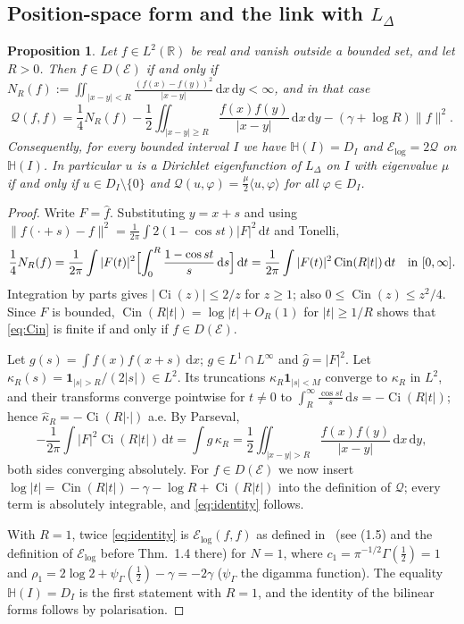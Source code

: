 \documentclass[11pt]{amsart}
\newcommand{\R}{\mathbb{R}}
\newcommand{\E}{\mathcal{E}}
\newcommand{\Hs}{\mathbb{H}}
\newcommand{\LD}{L_\Delta}
\newcommand{\one}{\mathbf{1}}
\newcommand{\dd}{\,\mathrm{d}}
\DeclareMathOperator{\Cin}{Cin}
\DeclareMathOperator{\Ci}{Ci}
\newtheorem{proposition}[theorem]{Proposition}
\theoremstyle{definition}
\theoremstyle{remark}
\numberwithin{equation}{section}
\begin{document}
\subsection{Position-space form and the link with \texorpdfstring{$\LD$}{L-Delta}}

\begin{proposition}\label{prop:identity}
Let $f\in L^2(\R)$ be real and vanish outside a bounded set, and let $R>0$. Then $f\in D(\E)$ if and only if $N_R(f):=\iint_{|x-y|<R}\frac{(f(x)-f(y))^2}{|x-y|}\dd x\dd y<\infty$, and in that case
\begin{equation}\label{eq:identity}
\mathcal Q(f,f)=\frac14N_R(f)-\frac12\iint_{|x-y|\ge R}\frac{f(x)f(y)}{|x-y|}\dd x\dd y-(\gamma+\log R)\|f\|^2 .
\end{equation}
Consequently, for every bounded interval $I$ we have $\Hs(I)=D_I$ and $\E_{\log}=2\mathcal Q$ on $\Hs(I)$. In particular $u$ is a Dirichlet eigenfunction of $\LD$ on $I$ with eigenvalue $\mu$ if and only if $u\in D_I\setminus\{0\}$ and $\mathcal Q(u,\varphi)=\frac\mu2\langle u,\varphi\rangle$ for all $\varphi\in D_I$.
\end{proposition}

\begin{proof}
Write $F=\hat f$. Substituting $y=x+s$ and using $\|f(\cdot+s)-f\|^2=\frac1{2\pi}\int2(1-\cos st)|F|^2\dd t$ and Tonelli,
\begin{equation}\label{eq:Cin}
\frac14N_R(f)=\frac1{2\pi}\int|F(t)|^2\Bigl[\int_0^R\frac{1-\cos st}{s}\dd s\Bigr]\dd t=\frac1{2\pi}\int|F(t)|^2\Cin(R|t|)\dd t\quad\text{in }[0,\infty].
\end{equation}
Integration by parts gives $|\Ci(z)|\le2/z$ for $z\ge1$; also $0\le\Cin(z)\le z^2/4$. Since $F$ is bounded, $\Cin(R|t|)=\log|t|+O_R(1)$ for $|t|\ge1/R$ shows that \eqref{eq:Cin} is finite if and only if $f\in D(\E)$.

Let $g(s)=\int f(x)f(x+s)\dd x$; $g\in L^1\cap L^\infty$ and $\hat g=|F|^2$. Let $\kappa_R(s)=\one_{|s|>R}/(2|s|)\in L^2$. Its truncations $\kappa_R\one_{|s|<M}$ converge to $\kappa_R$ in $L^2$, and their transforms converge pointwise for $t\neq0$ to $\int_R^\infty\frac{\cos st}{s}\dd s=-\Ci(R|t|)$; hence $\hat\kappa_R=-\Ci(R|\cdot|)$ a.e. By Parseval,
\[
-\frac1{2\pi}\int|F|^2\Ci(R|t|)\dd t=\int g\,\kappa_R=\frac12\iint_{|x-y|>R}\frac{f(x)f(y)}{|x-y|}\dd x\dd y,
\]
both sides converging absolutely. For $f\in D(\E)$ we now insert $\log|t|=\Cin(R|t|)-\gamma-\log R+\Ci(R|t|)$ into the definition of $\mathcal Q$; every term is absolutely integrable, and \eqref{eq:identity} follows.

With $R=1$, twice \eqref{eq:identity} is $\E_{\log}(f,f)$ as defined in~\cite{CW19} (see (1.5) and the definition of $\E_{\log}$ before Thm.~1.4 there) for $N=1$, where $c_1=\pi^{-1/2}\Gamma(\frac12)=1$ and $\rho_1=2\log2+\psi_\Gamma(\frac12)-\gamma=-2\gamma$ ($\psi_\Gamma$ the digamma function). The equality $\Hs(I)=D_I$ is the first statement with $R=1$, and the identity of the bilinear forms follows by polarisation.
\end{proof}
\end{document}
